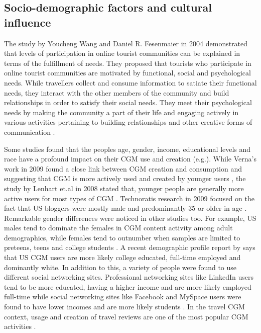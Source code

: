 \subsection{Socio-demographic factors and cultural influence}

 

The study by Youcheng Wang and Daniel R. Fesenmaier in 2004 demonstrated that levels of participation in online tourist communities can be explained in terms of the fulfillment of needs. They proposed that tourists who participate in online tourist communities are motivated by functional, social and psychological needs. While travellers collect and consume information to satiate their functional needs, they interact with the other members of the community and build relationships in order to satisfy their social needs. They meet their psychological needs by making the community a part of their life and engaging actively in various activities pertaining to building relationships and other creative forms of communication \cite{wang2002defining}.

Some studies found that the people\textquotesingle s age, gender, income, educational levels and race have a profound impact on their CGM use and creation (e.g.\cite{lenhart2008teens}\cite{verna2009user}). While Verna's work in 2009 found a close link between CGM creation and consumption and suggesting that CGM is more actively used and created by younger users \cite{verna2009user}, the study by Lenhart et.al in 2008 stated that, younger people are generally more active users for most types of CGM \cite{lenhart2008teens}.  Technorati\textquotesingle s research in 2009 focused on the fact that US bloggers were mostly male and predominantly 35 or older in age \cite{Technorati, 2008}. Remarkable gender differences were noticed in other studies too. For example, US males tend to dominate the females in CGM content activity among adult demographics, while females tend to outnumber when samples are limited to preteens, teens and college students \cite{verna2009user}. A recent demographic profile report by \cite{eMarketer, 2009} says that US CGM users are more likely college educated, full-time employed and dominantly white. In addition to this, a variety of people were found to use different social networking sites. Professional networking sites like LinkedIn users tend to be more educated, having a higher income and are more likely employed full-time while social networking sites like Facebook and MySpace users were found to have lower incomes and are more likely students \cite{eMarketer, 2009}. In the travel CGM context, usage and creation of travel reviews are one of the most popular CGM activities \cite{gretzel2007online}.
 

